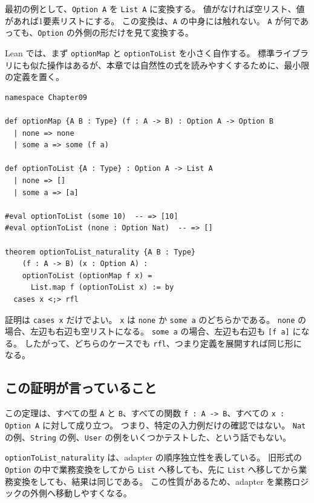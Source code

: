 最初の例として、\texttt{Option A} を \texttt{List A} に変換する。
値がなければ空リスト、値があれば1要素リストにする。
この変換は、\texttt{A} の中身には触れない。
\texttt{A} が何であっても、\texttt{Option} の外側の形だけを見て変換する。

\begin{leanbox}
Lean では、まず \texttt{optionMap} と \texttt{optionToList} を小さく自作する。
標準ライブラリにも似た操作はあるが、本章では自然性の式を読みやすくするために、最小限の定義を置く。
\end{leanbox}

\begin{listing}[htbp]
\begin{verbatim}
namespace Chapter09

def optionMap {A B : Type} (f : A -> B) : Option A -> Option B
  | none => none
  | some a => some (f a)

def optionToList {A : Type} : Option A -> List A
  | none => []
  | some a => [a]

#eval optionToList (some 10)  -- => [10]
#eval optionToList (none : Option Nat)  -- => []

theorem optionToList_naturality {A B : Type}
    (f : A -> B) (x : Option A) :
    optionToList (optionMap f x) =
      List.map f (optionToList x) := by
  cases x <;> rfl
\end{verbatim}
\caption{OptionからListへのadapterと自然性}
\label{lst:ch09_option_to_list}
\end{listing}

証明は \texttt{cases x} だけでよい。
\texttt{x} は \texttt{none} か \texttt{some a} のどちらかである。
\texttt{none} の場合、左辺も右辺も空リストになる。
\texttt{some a} の場合、左辺も右辺も \texttt{[f a]} になる。
したがって、どちらのケースでも \texttt{rfl}、つまり定義を展開すれば同じ形になる。

\subsection{この証明が言っていること}

この定理は、すべての型 \texttt{A} と \texttt{B}、すべての関数 \texttt{f : A -> B}、すべての \texttt{x : Option A} に対して成り立つ。
つまり、特定の入力例だけの確認ではない。
\texttt{Nat} の例、\texttt{String} の例、\texttt{User} の例をいくつかテストした、という話でもない。

\begin{softwarebox}
\texttt{optionToList\_naturality} は、adapter の順序独立性を表している。
旧形式の \texttt{Option} の中で業務変換をしてから \texttt{List} へ移しても、先に \texttt{List} へ移してから業務変換をしても、結果は同じである。
この性質があるため、adapter を業務ロジックの外側へ移動しやすくなる。
\end{softwarebox}

